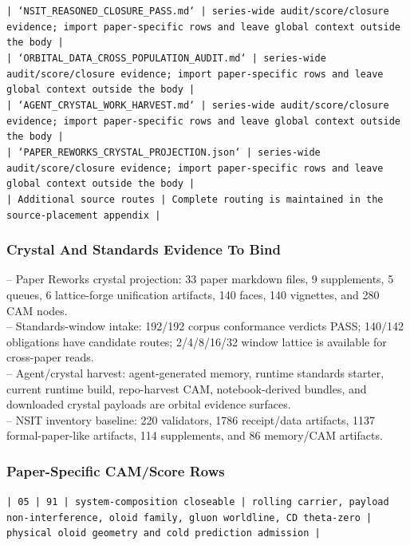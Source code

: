 \documentclass[11pt]{article}
\begin{document}
\noindent\texttt{| `NSIT\_REASONED\_CLOSURE\_PASS.md` | series-wide audit/score/closure evidence; import paper-specific rows and leave global context outside the body |}\\
\noindent\texttt{| `ORBITAL\_DATA\_CROSS\_POPULATION\_AUDIT.md` | series-wide audit/score/closure evidence; import paper-specific rows and leave global context outside the body |}\\
\noindent\texttt{| `AGENT\_CRYSTAL\_WORK\_HARVEST.md` | series-wide audit/score/closure evidence; import paper-specific rows and leave global context outside the body |}\\
\noindent\texttt{| `PAPER\_REWORKS\_CRYSTAL\_PROJECTION.json` | series-wide audit/score/closure evidence; import paper-specific rows and leave global context outside the body |}\\
\noindent\texttt{| Additional source routes | Complete routing is maintained in the source-placement appendix |}\\

\subsubsection*{Crystal And Standards Evidence To Bind}

\noindent{}-- Paper Reworks crystal projection: 33 paper markdown files, 9 supplements, 5 queues, 6 lattice-forge unification artifacts, 140 faces, 140 vignettes, and 280 CAM nodes.\\
\noindent{}-- Standards-window intake: 192/192 corpus conformance verdicts PASS; 140/142 obligations have candidate routes; 2/4/8/16/32 window lattice is available for cross-paper reads.\\
\noindent{}-- Agent/crystal harvest: agent-generated memory, runtime standards starter, current runtime build, repo-harvest CAM, notebook-derived bundles, and downloaded crystal payloads are orbital evidence surfaces.\\
\noindent{}-- NSIT inventory baseline: 220 validators, 1786 receipt/data artifacts, 1137 formal-paper-like artifacts, 114 supplements, and 86 memory/CAM artifacts.\\

\subsubsection*{Paper-Specific CAM/Score Rows}

\noindent\texttt{| 05 | 91 | system-composition closeable | rolling carrier, payload non-interference, oloid family, gluon worldline, CD theta-zero | physical oloid geometry and cold prediction admission |}\\
\end{document}
